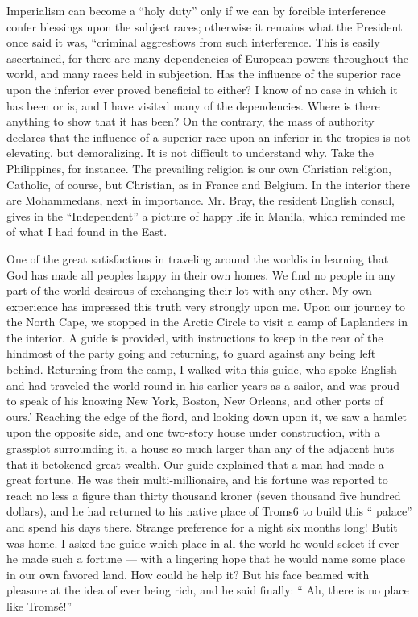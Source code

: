 \documentclass[11pt,openany]{book}
\begin{document}
Imperialism can become a ``holy duty'' only if we can by forcible interference confer blessings upon the subject races; otherwise it remains what the President once said it was, ``criminal aggresflows from such interference. This is easily ascertained, for there are many dependencies of European powers throughout the world, and many races held in subjection. Has the influence of the superior race upon the inferior ever proved beneficial to either? I know of no case in which it has been or is, and I have visited many of the dependencies. Where is there anything to show that it has been? On the contrary, the mass of authority declares that the influence of a superior race upon an inferior in the tropics is not elevating, but demoralizing. It is not difficult to understand why. Take the Philippines, for instance. The prevailing religion is our own Christian religion, Catholic, of course, but Christian, as in France and Belgium. In the interior there are Mohammedans, next in importance. Mr. Bray, the resident English consul, gives in the ``Independent'' a picture of happy life in Manila, which reminded me of what I had found in the East.

One of the great satisfactions in traveling around the worldis in learning that God has made all peoples happy in their own homes. We find no people in any part of the world desirous of exchanging their lot with any other. My own experience has impressed this truth very strongly upon me. Upon our journey to the North Cape, we stopped in the Arctic Circle to visit a camp of Laplanders in the interior. A guide is provided, with instructions to keep in the rear of the hindmost of the party going and returning, to guard against any being left behind. Returning from the camp, I walked with this guide, who spoke English and had traveled the world round in his earlier years as a sailor, and was proud to speak of his knowing New York, Boston, New Orleans, and other ports of ours.' Reaching the edge of the fiord, and looking down upon it, we saw a hamlet upon the opposite side, and one two-story house under construction, with a grassplot surrounding it, a house so much larger than any of the adjacent huts that it betokened great wealth. Our guide explained that a man had made a great fortune. He was their multi-millionaire, and his fortune was reported to reach no less a figure than thirty thousand kroner (seven thousand five hundred dollars), and he had returned to his native place of Troms6 to build this `` palace'' and spend his days there. Strange preference for a night six months long! Butit was home. I asked the guide which place in all the world he would select if ever he made such a fortune --- with a lingering hope that he would name some place in our own favored land. How could he help it? But his face beamed with pleasure at the idea of ever being rich, and he said finally: `` Ah, there is no place like Tromsé!''
\end{document}
